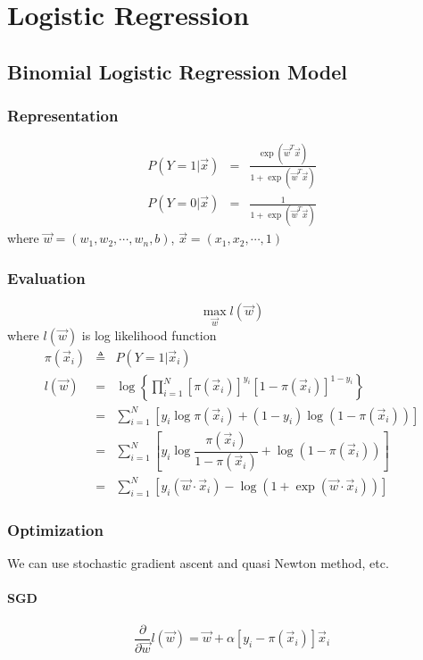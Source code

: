 \chapter{Logistic Regression}


\section{Binomial Logistic Regression Model}


\subsection{Representation}

\begin{eqnarray}
  P(Y=1|\vec{x}) &=& \frac{\exp(\vec{w}^T\vec{x})}{1+\exp(\vec{w}^T\vec{x})} \\
  P(Y=0|\vec{x}) &=& \frac{1}{1+\exp(\vec{w}^T\vec{x})}
\end{eqnarray}
where $\vec{w}=(w_1, w_2,\cdots, w_n, b)$, $\vec{x}=(x_1,x_2,\cdots, 1)$


\subsection{Evaluation}
\begin{equation}
\max_{\vec{w}} l(\vec{w})
\end{equation}
where $l(\vec{w})$ is log likelihood function
\begin{eqnarray*}
\pi(\vec{x}_i) & \triangleq & P(Y=1|\vec{x}_i) \\
l(\vec{w}) &=& \log\left\{\prod\limits_{i=1}^N{\left[\pi(\vec{x}_i)\right]^{y_i}\left[1-\pi(\vec{x}_i)\right]^{1-y_i}}\right\} \\
           &=& \sum\limits_{i=1}^N\left[y_i\log\pi(\vec{x}_i)+(1-y_i)\log(1-\pi(\vec{x}_i))\right] \\
		   &=& \sum\limits_{i=1}^N\left[y_i\log\dfrac{\pi(\vec{x}_i)}{1-\pi(\vec{x}_i)}+\log(1-\pi(\vec{x}_i))\right] \\
		   &=& \sum\limits_{i=1}^N\left[y_i(\vec{w}\cdot\vec{x}_i)-\log(1+\exp(\vec{w}\cdot\vec{x}_i))\right]
\end{eqnarray*}


\subsection{Optimization}
We can use stochastic gradient ascent and quasi Newton method, etc.


\subsubsection{SGD}

$$ \dfrac{\partial}{\partial \vec{w}}l(\vec{w}) = \vec{w} + \alpha\left[y_i - \pi(\vec{x}_i) \right]\vec{x}_i $$

